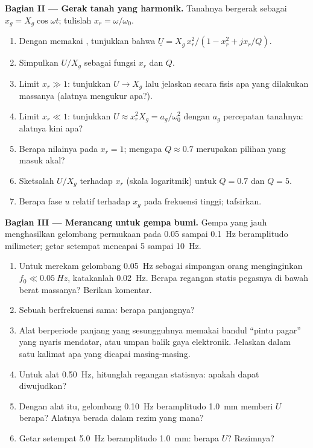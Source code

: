 \begin{problem}
\medskip
\noindent\textbf{Bagian II --- Gerak tanah yang harmonik.}
Tanahnya bergerak sebagai $x_g = X_g\cos\omega t$; tulislah $x_r = \omega/\omega_0$.
\begin{enumerate}[resume]
  \item Dengan memakai , tunjukkan bahwa
        $\underline U = X_g\,x_r^2/
        (1 - x_r^2 + jx_r/Q)$.
  \item Simpulkan $U/X_g$ sebagai fungsi $x_r$ dan $Q$.
  \item Limit $x_r \gg 1$: tunjukkan $U \to X_g$ lalu jelaskan secara
        fisis apa yang dilakukan massanya (alatnya mengukur apa?).
  \item Limit $x_r \ll 1$: tunjukkan $U \approx x_r^2X_g = a_g/\omega_0^2$
        dengan $a_g$  percepatan tanahnya: alatnya kini apa?
  \item Berapa nilainya pada $x_r = 1$; mengapa $Q \approx 0.7$ merupakan
        pilihan yang masuk akal?
  \item Sketsalah $U/X_g$ terhadap $x_r$ (skala logaritmik) untuk
        $Q = 0.7$ dan $Q = 5$.
  \item Berapa fase $u$ relatif terhadap $x_g$ pada frekuensi tinggi;
        tafsirkan.
\end{enumerate}

\medskip
\noindent\textbf{Bagian III --- Merancang untuk gempa bumi.}
Gempa yang jauh menghasilkan gelombang permukaan pada \qty{0.05}{}
sampai \qty{0.1}{Hz} beramplitudo milimeter; getar setempat mencapai
\qty{5}{} sampai \qty{10}{Hz}.
\begin{enumerate}[resume]
  \item Untuk merekam gelombang \qty{0.05}{Hz} sebagai simpangan orang
        menginginkan $f_0 \ll \qty{0.05}{Hz}$, katakanlah \qty{0.02}{Hz}.
        Berapa regangan statis pegasnya di bawah berat massanya? Berikan
        komentar.
  \item Sebuah  berfrekuensi sama: berapa panjangnya?
  \item Alat berperiode panjang yang sesungguhnya memakai bandul
        ``pintu pagar'' yang nyaris mendatar, atau umpan balik gaya
        elektronik. Jelaskan dalam satu kalimat apa yang dicapai
        masing-masing.
  \item Untuk alat \qty{0.50}{Hz}, hitunglah regangan statisnya: apakah
        dapat diwujudkan?
  \item Dengan alat itu, gelombang \qty{0.10}{Hz} beramplitudo
        \qty{1.0}{mm} memberi $U$ berapa? Alatnya berada dalam rezim yang mana?
  \item Getar setempat \qty{5.0}{Hz} beramplitudo \qty{1.0}{mm}: berapa
        $U$? Rezimnya?
\end{enumerate}


\end{problem}
